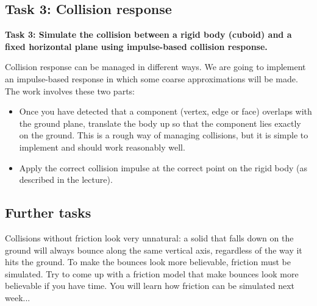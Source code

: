 \documentclass[12pt]{article}
\begin{document}
\subsection*{Task 3: Collision response}

\textbf{Task 3: Simulate the collision between a rigid body (cuboid) and a fixed horizontal plane using impulse-based collision response.}

Collision response can be managed in different ways. We are going to implement an impulse-based response in which some coarse approximations will be made. The work involves these two parts:

\begin{itemize}
\item Once you have detected that a component (vertex, edge or face) overlaps with the ground plane, translate the body up so that the component lies exactly on the ground. This is a rough way of managing collisions, but it is simple to implement and should work reasonably well.
\item Apply the correct collision impulse at the correct point on the rigid body (as described in the lecture).
\end{itemize}

\subsection{Further tasks}

Collisions without friction look very unnatural: a solid that falls down on the ground will always bounce along the same vertical axis, regardless of the way it hits the ground. To make the bounces look more believable, friction must be simulated. Try to come up with a friction model that make bounces look more believable if you have time. You will learn how friction can be simulated next week... 


\end{document}
